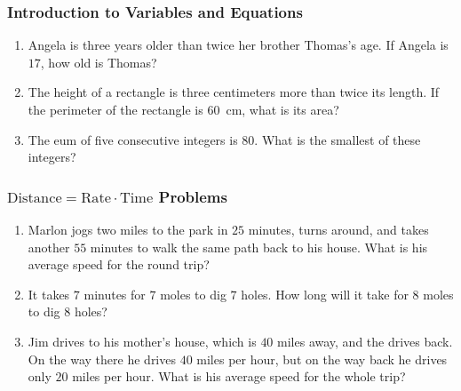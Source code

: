 \documentclass{article}
\begin{document}
    \subsubsection*{Introduction to Variables and Equations}
    \begin{enumerate}
        \item Angela is three years older than twice her brother Thomas's age.
        If Angela is $17$, how old is Thomas?
        \vspace{3cm}
        \item The height of a rectangle is three centimeters more than twice its
        length. If the perimeter of the rectangle is \SI{60}{\cm}, what is its
        area?
        \vspace{3cm}
        \item The eum of five consecutive integers is $80$. What is the smallest
        of these integers?
        \vspace{3cm}
    \end{enumerate}
    \subsubsection*{$\text{Distance} = \text{Rate} \cdot \text{Time}$ Problems}
    \begin{enumerate}[resume]
        \item Marlon jogs two miles to the park in $25$ minutes, turns around,
        and takes another $55$ minutes to walk the same path back to his house.
        What is his average speed for the round trip?
        \vspace{3cm}
        \item It takes $7$ minutes for $7$ moles to dig $7$ holes. How long will
        it take for $8$ moles to dig $8$ holes?
        \vspace{3cm}
        \item Jim drives to his mother's house, which is $40$ miles away, and
        the drives back. On the way there he drives $40$ miles per hour, but on
        the way back he drives only $20$ miles per hour. What is his average
        speed for the whole trip?
        \vspace{3cm}
    \end{enumerate}
\end{document}
